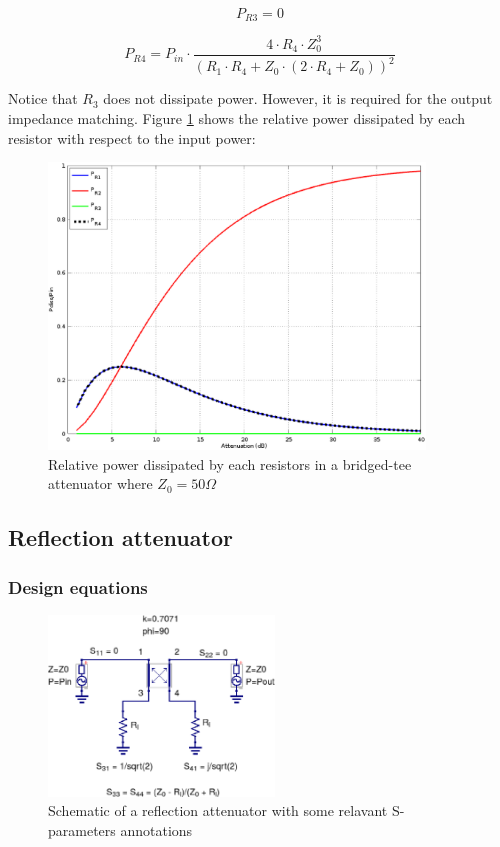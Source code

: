 \begin{equation}
P_{R3} = 0
\end{equation}

\begin{equation}
P_{R4} = P_{in} \cdot \dfrac{4\cdot R_4\cdot Z_0^3}{ (R_1 \cdot R_4 + Z_0 \cdot (2 \cdot R_4 + Z_0))^2}
\end{equation}

\noindent Notice that $R_3$ does not dissipate power. However, it is required for the output impedance matching. Figure \ref{fig:bridged-tee_pow_diss_Z0_50} shows the relative power dissipated by each resistor with respect to the input power:

\begin{figure}[ht]
\begin{center}
\includegraphics[width=10cm]{Relative-dissipated-power-bridged-tee-50}
\end{center}
\caption{Relative power dissipated by each resistors in a bridged-tee attenuator where $Z_{0} = 50\Omega$}
\label{fig:bridged-tee_pow_diss_Z0_50}
\end{figure}
\FloatBarrier

\clearpage
\subsection{Reflection attenuator}
\subsubsection{Design equations}
\begin{figure}[ht]
\begin{center}
\includegraphics[width=6cm]{Reflection-Attenuator-Power-Dissipation}
\end{center}
\caption{Schematic of a reflection attenuator with some relavant S-parameters annotations}
\label{fig:reflec-attenuator-schematic}
\end{figure}
\FloatBarrier

